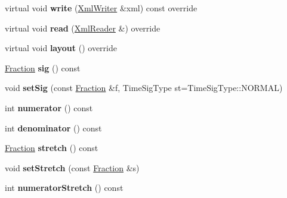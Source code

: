 \begin{DoxyCompactItemize}
virtual void {\bfseries write} (\hyperlink{class_ms_1_1_xml_writer}{Xml\+Writer} \&xml) const override
\item 
\mbox{\label{class_ms_1_1_time_sig_ad65da2674dfc8e65e4bceed584e05ba6}} 
virtual void {\bfseries read} (\hyperlink{class_ms_1_1_xml_reader}{Xml\+Reader} \&) override
\item 
\mbox{\label{class_ms_1_1_time_sig_ac05d6d09cbb195e39fa48c5611d08e31}} 
virtual void {\bfseries layout} () override
\item 
\mbox{\label{class_ms_1_1_time_sig_adf5c9dc552745c05fda274364a894881}} 
\hyperlink{class_ms_1_1_fraction}{Fraction} {\bfseries sig} () const
\item 
\mbox{\label{class_ms_1_1_time_sig_a78e7202ffb38948cd251b6e86eab9ef1}} 
void {\bfseries set\+Sig} (const \hyperlink{class_ms_1_1_fraction}{Fraction} \&f, Time\+Sig\+Type st=Time\+Sig\+Type\+::\+N\+O\+R\+M\+AL)
\item 
\mbox{\label{class_ms_1_1_time_sig_aefe81a6a27ea87de028d45ebe3ec45b9}} 
int {\bfseries numerator} () const
\item 
\mbox{\label{class_ms_1_1_time_sig_abed8eb110fc91cb3bbf8312d71c8c763}} 
int {\bfseries denominator} () const
\item 
\mbox{\label{class_ms_1_1_time_sig_a48f845d7303e0445e4d9bb220873accc}} 
\hyperlink{class_ms_1_1_fraction}{Fraction} {\bfseries stretch} () const
\item 
\mbox{\label{class_ms_1_1_time_sig_a6dbdd6cf940d030d60e32fd4b3f3500f}} 
void {\bfseries set\+Stretch} (const \hyperlink{class_ms_1_1_fraction}{Fraction} \&s)
\item 
\mbox{\label{class_ms_1_1_time_sig_aa1c0bf194cda7319fe7bb5d63a6412b6}} 
int {\bfseries numerator\+Stretch} () const
\item 
\mbox{\label{class_ms_1_1_time_sig_aa0109a629792215f3bcde9e40d5de7d6}} 

\end{DoxyCompactItemize}

